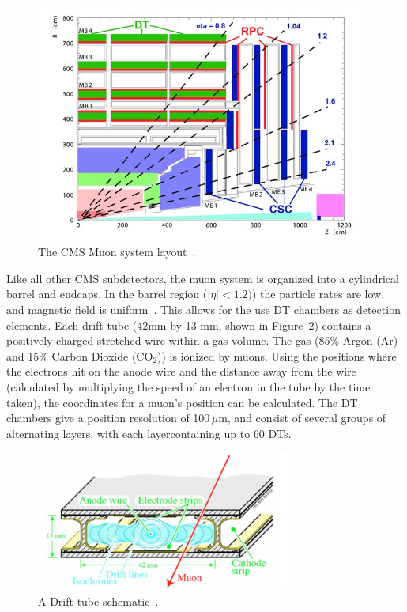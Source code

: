 \begin{figure}
\begin{center}
  \includegraphics[width=0.98\textwidth,keepaspectratio]{plots_and_figures/chapter3/muon_system_layout.jpg}
\caption{The CMS Muon system layout~\cite{muon1}.}
\label{fig:muon_system_layout}
\end{center}
\end{figure}

Like all other CMS subdetectors, the muon system is organized into a cylindrical barrel and endcaps. In the barrel region ($|\eta|<1.2)$) the particle rates are low, and magnetic field is uniform~\cite{cms_exp_ref}. This allows for the use DT chambers as detection elements. Each drift tube (42mm by 13 mm, shown in Figure~\ref{fig:drift_tube}) contains a positively charged stretched wire within a gas volume. The gas (85\% Argon (Ar) and 15\% Carbon Dioxide ($\mathrm{CO}_{2}$)) is ionized by muons. Using the positions where the electrons hit on the anode wire and the distance away from the wire (calculated by multiplying the speed of an electron in the tube by the time taken), the coordinates for a muon's position can be calculated. The DT chambers give a position resolution of 100\,$\mu$m, and consist of several groups of alternating layers, with each layercontaining up to 60 DTs.      

\begin{figure}
\begin{center}
  \includegraphics[width=0.75\textwidth,keepaspectratio]{plots_and_figures/chapter3/drift_tube.png}
\caption{A Drift tube schematic~\cite{cms_exp_ref}.}
\label{fig:drift_tube}
\end{center}
\end{figure}

